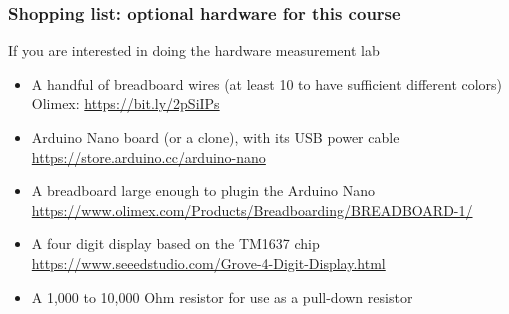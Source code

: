 \begin{frame}
\frametitle{Shopping list: optional hardware for this course}
  If you are interested in doing the hardware measurement lab
    \begin{itemize}
      \item A handful of breadboard wires (at least 10 to have sufficient different colors)\\
	    Olimex: \url{https://bit.ly/2pSiIPs}
      \item Arduino Nano board (or a clone), with its USB power cable\\
            \url{https://store.arduino.cc/arduino-nano}
      \item A breadboard large enough to plugin the Arduino Nano\\
            \url{https://www.olimex.com/Products/Breadboarding/BREADBOARD-1/}
      \item A four digit display based on the TM1637 chip\\
            \url{https://www.seeedstudio.com/Grove-4-Digit-Display.html}
      \item A 1,000 to 10,000 Ohm resistor for use as a pull-down resistor
    \end{itemize}
\end{frame}
